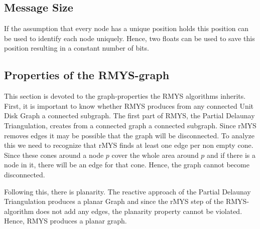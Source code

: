 \subsection{Message Size}
If the assumption that every node has a unique position holds this position can be used to identify each node uniquely.
Hence, two floats can be used to save this position resulting in a constant number of bits.

\subsection{Properties of the RMYS-graph}
This section is devoted to the graph-properties the RMYS algorithms inherits.
First, it is important to know whether RMYS produces from any connected Unit Disk Graph a connected subgraph.
The first part of RMYS, the Partial Delaunay Triangulation, creates from a connected graph a connected subgraph.
Since rMYS removes edges it may be possible that the graph will be disconnected.
To analyze this we need to recognize that rMYS finds at least one edge per non empty cone.
Since these cones around a node $p $ cover the whole area around $p $ and if there is a node in it, there will be an edge for that cone.
Hence, the graph cannot become disconnected. 

Following this, there is planarity.
The reactive approach of the Partial Delaunay Triangulation produces a planar Graph and since the rMYS step of the RMYS-algorithm does not add any edges, the planarity property cannot be violated.
Hence, RMYS produces a planar graph.


